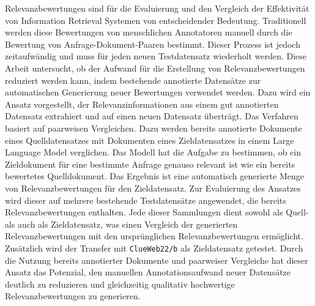 Relevanzbewertungen sind für die Evaluierung und den Vergleich der Effektivität von Information Retrieval Systemen von entscheidender Bedeutung. Traditionell werden diese Bewertungen von menschlichen Annotatoren manuell durch die Bewertung von Anfrage-Dokument-Paaren bestimmt. Dieser Prozess ist jedoch zeitaufwändig und muss für jeden neuen Testdatensatz wiederholt werden. Diese Arbeit untersucht, ob der Aufwand für die Erstellung von Relevanzbewertungen reduziert werden kann, indem bestehende annotierte Datensätze zur automatischen Generierung neuer Bewertungen verwendet werden. Dazu wird ein Ansatz vorgestellt, der Relevanzinformationen aus einem gut annotierten Datensatz extrahiert und auf einen neuen Datensatz überträgt. Das Verfahren basiert auf paarweisen Vergleichen. Dazu werden bereits annotierte Dokumente eines Quelldatensatzes mit Dokumenten eines Zieldatensatzes in einem Large Language Model verglichen. Das Modell hat die Aufgabe zu bestimmen, ob ein Zieldokument für eine bestimmte Anfrage genauso relevant ist wie ein bereits bewertetes Quelldokument. Das Ergebnis ist eine automatisch generierte Menge von Relevanzbewertungen für den Zieldatensatz. Zur Evaluierung des Ansatzes wird dieser auf mehrere bestehende Testdatensätze angewendet, die bereits Relevanzbewertungen enthalten. Jede dieser Sammlungen dient sowohl als Quell- als auch als Zieldatensatz, was einen Vergleich der generierten Relevanzbewertungen mit den ursprünglichen Relevanzbewertungen ermöglicht. Zusätzlich wird der Transfer mit \texttt{ClueWeb22/b} als Zieldatensatz getestet. Durch die Nutzung bereits annotierter Dokumente und paarweiser Vergleiche hat dieser Ansatz das Potenzial, den manuellen Annotationsaufwand neuer Datensätze deutlich zu reduzieren und gleichzeitig qualitativ hochwertige Relevanzbewertungen zu generieren.
